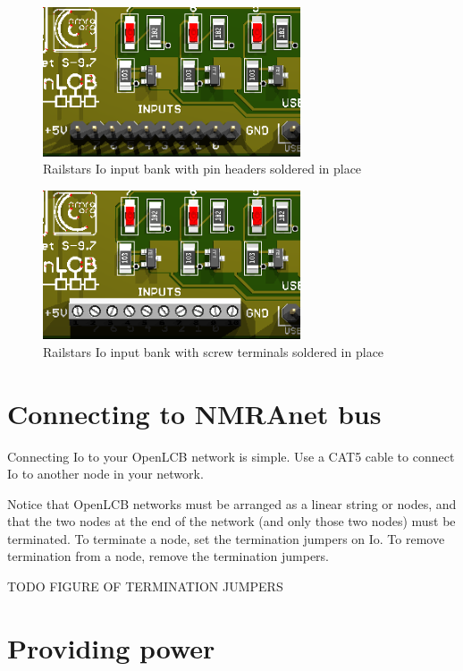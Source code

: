\documentclass[12pt]{book}
\begin{document}
\begin{figure}[htbp]
\begin{center}
\includegraphics[width=3in]{images/IoInputPinheader.png}
\caption{Railstars Io input bank with pin headers soldered in place}
\label{pinheader}
\end{center}
\end{figure}

\begin{figure}[htbp]
\begin{center}
\includegraphics[width=3in]{images/IoInputsWithScrewTerminal.png}
\caption{Railstars Io input bank with screw terminals soldered in place}
\label{screwterminal}
\end{center}
\end{figure}

\section{Connecting to NMRAnet bus}

Connecting Io to your OpenLCB network is simple. Use a CAT5 cable to connect Io to another node in your network.

Notice that OpenLCB networks must be arranged as a linear string or nodes, and that the two nodes at the end of the network (and only those two nodes) must be terminated. To terminate a node, set the termination jumpers on Io. To remove termination from a node, remove the termination jumpers.

TODO FIGURE OF TERMINATION JUMPERS

\section{Providing power}
\end{document}
